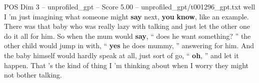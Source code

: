 \begin{textsample}{POS Dim 3 – unprofiled\_gpt – Score 5.00 – unprofiled\_gpt/t001296\_gpt.txt}  \label{ex:f3_pos_035}
well I 'm just imagining what someone might \textbf{say} next, \textbf{you} \textbf{know}, like an example.
There was that baby who was really lazy with talking and just let the other one do it all for him.
So when the mum would \textbf{say}, “ does he want something? ” the other child would jump in with, “ \textbf{yes} he does mummy, ” answering for him.
And the baby himself would hardly speak at all, just sort of go, “ \textbf{oh}, ” and let it happen.
That ’s the kind of thing I ’m thinking about when I worry they might not bother talking.

\end{textsample}
